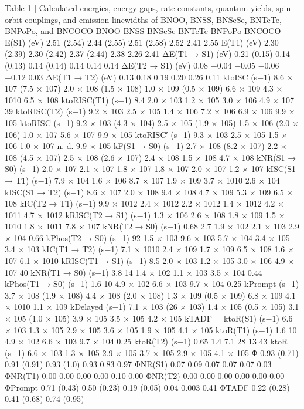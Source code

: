 Table 1 | Calculated energies, energy gaps, rate constants, quantum yields, spin-orbit couplings, and emission linewidths of
BNOO, BNSS, BNSeSe, BNTeTe, BNPoPo, and BNCOCO
BNOO
BNSS
BNSeSe
BNTeTe
BNPoPo
BNCOCO
E(S1) (eV)
2.51
(2.54)
2.44
(2.55)
2.51
(2.58)
2.52
2.41
2.55
E(T1) (eV)
2.30
(2.39)
2.30
(2.42)
2.37
(2.44)
2.38
2.26
2.41
ΔE(T1 → S1) (eV)
0.21
(0.15)
0.14
(0.13)
0.14
(0.14)
0.14
0.14
0.14
ΔE(T2 → S1) (eV)
0.08
−0.04
−0.05
−0.06
−0.12
0.03
ΔE(T1 → T2) (eV)
0.13
0.18
0.19
0.20
0.26
0.11
ktoISC (s−1)
8.6 × 107
(7.5 × 107)
2.0 × 108
(1.5 × 108)
1.0 × 109
(0.5 × 109)
6.6 × 109
4.3 × 1010
6.5 × 108
ktoRISC(T1) (s−1)
8.4
2.0 × 103
1.2 × 105
3.0 × 106
4.9 × 107
39
ktoRISC(T2) (s−1)
9.2 × 103
2.5 × 105
1.4 × 106
7.2 × 106
6.9 × 106
9.9 × 105
ktoRISC (s−1)
9.2 × 103
(4.3 × 104)
2.5 × 105
(1.9 × 105)
1.5 × 106
(2.0 × 106)
1.0 × 107
5.6 × 107
9.9 × 105
ktoRISC′ (s−1)
9.3 × 103
2.5 × 105
1.5 × 106
1.0 × 107
n. d.
9.9 × 105
kF(S1 → S0) (s−1)
2.7 × 108
(8.2 × 107)
2.2 × 108
(4.5 × 107)
2.5 × 108
(2.6 × 107)
2.4 × 108
1.5 × 108
4.7 × 108
kNR(S1 → S0) (s−1)
2.0 × 107
2.1 × 107
1.8 × 107
1.8 × 107
2.0 × 107
1.2 × 107
kISC(S1 → T1) (s−1)
7.9 × 104
1.6 × 106
8.7 × 107
1.9 × 109
3.7 × 1010
2.6 × 104
kISC(S1 → T2) (s−1)
8.6 × 107
2.0 × 108
9.4 × 108
4.7 × 109
5.3 × 109
6.5 × 108
kIC(T2 → T1) (s−1)
9.9 × 1012
2.4 × 1012
2.2 × 1012
1.4 × 1012
4.2 × 1011
4.7 × 1012
kRISC(T2 → S1) (s−1)
1.3 × 106
2.6 × 108
1.8 × 109
1.5 × 1010
1.8 × 1011
7.8 × 107
kNR(T2 → S0) (s−1)
0.68
2.7
1.9 × 102
2.1 × 103
2.9 × 104
0.66
kPhos(T2 → S0) (s−1)
92
1.5 × 103
9.6 × 103
5.7 × 104
3.4 × 105
3.4 × 103
kIC(T1 → T2) (s−1)
7.1 × 1010
2.4 × 109
1.7 × 109
6.5 × 108
1.6 × 107
6.1 × 1010
kRISC(T1 → S1) (s−1)
8.5
2.0 × 103
1.2 × 105
3.0 × 106
4.9 × 107
40
kNR(T1 → S0) (s−1)
3.8
14
1.4 × 102
1.1 × 103
3.5 × 104
0.44
kPhos(T1 → S0) (s−1)
1.6
10
4.9 × 102
6.6 × 103
9.7 × 104
0.25
kPrompt (s−1)
3.7 × 108
(1.9 × 108)
4.4 × 108
(2.0 × 108)
1.3 × 109
(0.5 × 109)
6.8 × 109
4.1 × 1010
1.1 × 109
kDelayed (s−1)
7.1 × 103
(26 × 103)
1.4 × 105
(0.5 × 105)
3.1 × 105
(1.0 × 105)
3.9 × 105
3.5 × 105
4.2 × 105
kTADF = ktoR(S1) (s−1)
6.6 × 103
1.3 × 105
2.9 × 105
3.6 × 105
1.9 × 105
4.1 × 105
ktoR(T1) (s−1)
1.6
10
4.9 × 102
6.6 × 103
9.7 × 104
0.25
ktoR(T2) (s−1)
0.65
1.4
7.1
28
13
43
ktoR (s−1)
6.6 × 103
1.3 × 105
2.9 × 105
3.7 × 105
2.9 × 105
4.1 × 105
Φ
0.93
(0.71)
0.91
(0.91)
0.93
(1.0)
0.93
0.83
0.97
ΦNR(S1)
0.07
0.09
0.07
0.07
0.07
0.03
ΦNR(T1)
0.00
0.00
0.00
0.00
0.10
0.00
ΦNR(T2)
0.00
0.00
0.00
0.00
0.00
0.00
ΦPrompt
0.71
(0.43)
0.50
(0.23)
0.19
(0.05)
0.04
0.003
0.41
ΦTADF
0.22
(0.28)
0.41
(0.68)
0.74
(0.95)
